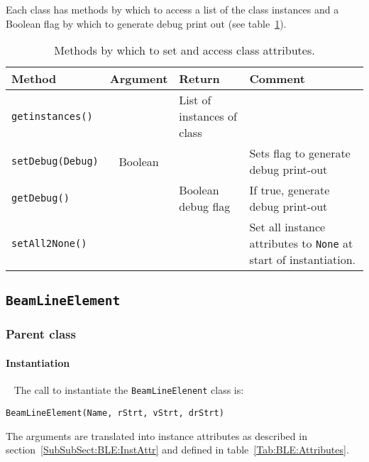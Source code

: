 Each class has methods by which to access a list of the class
instances and a Boolean flag by which to generate debug print out (see
table~\ref{Tab:ClassAttributeAccess}).
\begin{table}[h]
  \caption{Methods by which to set and access class attributes.}
  \label{Tab:ClassAttributeAccess}
  \begin{center}
    \begin{tabular}{|l|c|l|p{7cm}|}
      \hline
      \textbf{Method}          & \textbf{Argument} & \textbf{Return}            & \textbf{Comment}                      \\
      \hline
      \texttt{getinstances()}  &                   & List of instances of class &                                       \\
      \texttt{setDebug(Debug)} & Boolean           &                            & Sets flag to generate debug print-out \\
      \texttt{getDebug()}      &                   & Boolean debug flag         & If true, generate debug print-out     \\
      \texttt{setAll2None()}   &                   &                            & Set all instance attributes to \texttt{None} at start of instantiation. \\
      \hline
    \end{tabular}
  \end{center}
\end{table}

\subsection{\texttt{BeamLineElement}}
\label{SubSubSect:BLE}

\subsubsection{Parent class}

\paragraph{Instantiation} ~\newline
\noindent
The call to instantiate the \texttt{BeamLineElenent} class is:
\begin{center}
  \texttt{BeamLineElement(Name, rStrt, vStrt, drStrt)}
\end{center}
The arguments are translated into instance attributes as described in
section~\ref{SubSubSect:BLE:InstAttr} and defined in
table~\ref{Tab:BLE:Attributes}.

